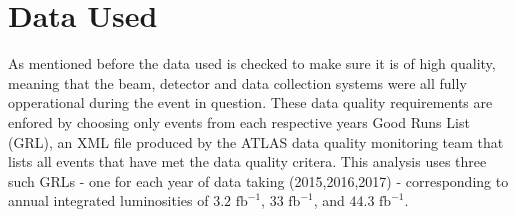 \section{Data Used} \label{sec:data:data}

As mentioned before the data used is checked to make sure it is of high
quality, meaning that the beam, detector and data collection systems were all
fully opperational during the event in question. These data quality
requirements are enfored by choosing only events from each respective years
Good Runs List (GRL), an XML file produced by the ATLAS data quality
monitoring team that lists all events that have met the data quality critera.
This analysis uses three such GRLs - one for each year of data taking
(2015,2016,2017) - corresponding to annual integrated luminosities of $3.2
\text{ fb}^{-1}$, $33 \text{ fb}^{-1}$, and $44.3 \text{ fb}^{-1}$.
